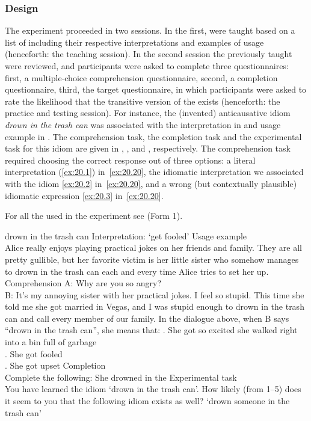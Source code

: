 \documentclass[output=paper]{langsci/langscibook}
\begin{document}
\subsubsection{Design} 
The experiment proceeded in two sessions. In the first, 
 were taught based on a list of  including their
respective interpretations and examples of usage (henceforth: the teaching
session). In the second session the  previously taught were reviewed, and
participants were asked to complete three questionnaires: first, a multiple-choice
comprehension questionnaire, second, a completion questionnaire, third, the
target questionnaire, in which participants were asked to rate the likelihood
that the transitive version of the  exists (henceforth: the practice and
testing session). For instance, the (invented) anticausative idiom \emph{drown
in the trash can}  was associated with the interpretation in
 and usage example in .  The comprehension
task, the completion task and the experimental task for this idiom are
given in , , and ,
respectively. The comprehension task required choosing the correct response out
of three options: a literal interpretation (\ref{ex:20.1}) in~\eqref{ex:20.20}, the
idiomatic interpretation we associated with the idiom
\eqref{ex:20.2}
in~\eqref{ex:20.20}, and a wrong (but contextually plausible) idiomatic
expression \eqref{ex:20.3} in~\eqref{ex:20.20}.

For all the  used in the experiment see  (Form 1).

\ea\label{ex:20.18}
    \ea\label{ex:20.18a} drown in the trash can
    \ex\label{ex:20.18b} Interpretation: `get fooled'
    \z
\ex \label{ex:20.19}Usage example\\
    Alice really enjoys playing practical jokes on her friends and family. They
    are all pretty gullible, but her favorite victim is her little sister who
    somehow manages to drown in the trash can each and every time Alice tries
    to set her up.
\ex \label{ex:20.20}Comprehension
    \sn A: Why are you so angry?\\
        B: It's my annoying sister with her practical jokes.  I feel so stupid.
        This time she told me she got married in Vegas, and I was stupid enough
        to drown in the trash can and call every member of our family.
    \sn In the dialogue above, when B says \enquote{drown in the trash
        can}, she means that:
    . She got so excited she walked right into a bin full of garbage\\
    . She got fooled\\
    . She got upset
\ex \label{ex:20.21}Completion\\
    Complete the following: She drowned in the \underline{\hphantom{3em}}
\ex \label{ex:20.22}Experimental task\\
    You have learned the idiom `drown in the trash can'. How likely (from 1--5)
    does it seem to you that the following idiom exists as well?
    \sn \enquote*{drown someone in the trash can}
\z
\end{document}
